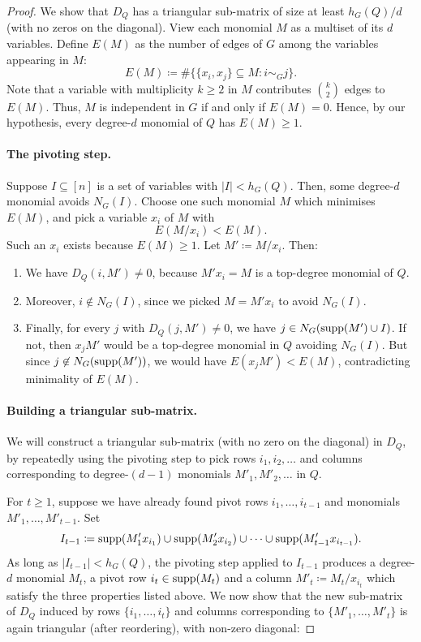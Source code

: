 \documentclass{article}
\begin{document}
\begin{proof}
    We show that $D_Q$ has a triangular sub-matrix of size at least $h_G(Q)/d$ (with no zeros on the diagonal). View each monomial $M$ as a multiset of its $d$ variables.
    Define $E(M)$ as the number of edges of $G$ among the variables appearing in $M$:
    \[
        E(M) \coloneqq \#\bigl\{\{x_i,x_j\} \subseteq M : i \sim_G j\bigr\}.
    \]
    Note that a variable with multiplicity $k\geq 2$ in $M$ contributes $\binom{k}{2}$ edges to $E(M)$. Thus, $M$ is independent in $G$ if and only if $E(M) = 0$. Hence, by our hypothesis, every degree-$d$ monomial of $Q$ has $E(M) \geq 1$.

    \paragraph{The pivoting step.}
    Suppose $I\subseteq [n]$ is a set of variables with $|I| < h_G(Q)$. Then, some degree-$d$ monomial avoids $N_G(I)$.
    Choose one such monomial $M$ which minimises $E(M)$, and pick a variable $x_i$ of $M$ with
    \[
        E(M/x_i) < E(M).
    \]
    Such an $x_i$ exists because $E(M)\geq 1$.
    Let $M' \coloneqq M/x_i$. Then:
    \begin{enumerate}
        \item[(a)] We have $D_Q(i, M') \neq 0$, because $M'x_i = M$ is a top-degree monomial of $Q$.
        \item[(b)] Moreover, $i \notin N_G(I)$, since we picked $M = M'x_i$ to avoid $N_G(I)$.
        \item[(c)] Finally, for every $j$ with $D_Q(j, M') \neq 0$, we have $j\in N_G(\operatorname{supp}(M')\cup I)$. If not, then $x_jM'$ would be a top-degree monomial in $Q$ avoiding $N_G(I)$. But since $j\not\in N_G(\operatorname{supp}(M'))$, we would have $E(x_jM') < E(M)$, contradicting minimality of $E(M)$.
    \end{enumerate}
    
    \paragraph{Building a triangular sub-matrix.}
    We will construct a triangular sub-matrix (with no zero on the diagonal) in $D_Q$, by repeatedly using the pivoting step to pick rows $i_1,i_2,\dots$ and columns corresponding to degree-$(d-1)$ monomials $M'_1,M'_2,\dots$ in $Q$.
    
    For $t\geq 1$, suppose we have already found pivot rows $i_1,\dots, i_{t-1}$ and monomials $M'_1,\dots, M'_{t-1}$. Set
    \[
        I_{t-1} \coloneqq \operatorname{supp}(M'_1x_{i_1})\cup \operatorname{supp}(M'_2x_{i_2})\cup \cdots \cup \operatorname{supp}(M'_{t-1}x_{i_{t-1}}).
    \]
    As long as $|I_{t-1}| < h_G(Q)$, the pivoting step applied to $I_{t-1}$ produces a degree-$d$ monomial $M_t$, a pivot row $i_t\in \operatorname{supp}(M_t)$ and a column $M'_t \coloneqq M_t/x_{i_t}$ which satisfy the  three properties listed above.
    We now show that the new sub-matrix of $D_Q$ induced by rows $\{i_1,\dots,i_t\}$ and columns corresponding to $\{M'_1,\dots, M'_t\}$ is again triangular (after reordering), with non-zero diagonal:
    

\end{proof}
\end{document}
